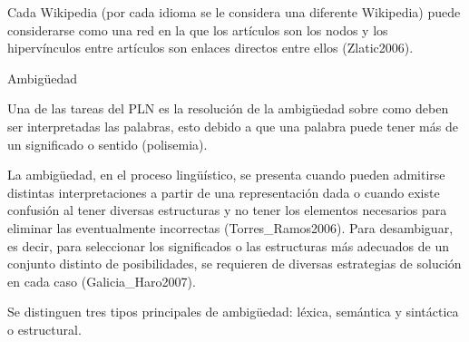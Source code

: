 \documentclass[letterpaper]{article}
\newcommand\textstylebibuscitbase[1]{#1}
\begin{document}
\bigskip

{\sffamily
\textstylebibuscitbase{Cada Wikipedia (por cada idioma se le considera
una diferente Wikipedia) puede considerarse como una red en la que los
art\'iculos son los nodos y los hiperv\'inculos entre
art\'icu}\textstylebibuscitbase{los son enlaces directos entre ellos
}\textstylebibuscitbase{(Zlatic2006)}\textstylebibuscitbase{.}}


\bigskip


\bigskip


\bigskip

{\sffamily
Ambig\"uedad}


\bigskip

{\sffamily
Una de las tareas del PLN es la resoluci\'on de la ambig\"uedad sobre
como deben ser interpretadas las palabras, esto debido a que una
palabra puede tener m\'as de un significado o sentido (polisemia). }


\bigskip

{\sffamily
La ambig\"uedad, en el proceso ling\"u\'istico, se presenta cuando
pueden admitirse distintas interpretaciones a partir de una
representaci\'on dada o cuando existe confusi\'on al tener diversas
estructuras y no tener los elementos necesarios para eliminar las
eventualmente incorrectas \textstylebibuscitbase{(Torres\_Ramos2006)}.
\foreignlanguage{spanish}{Para desambiguar, es decir, para seleccionar
los significados o
}\textstylebibuscitbase{\foreignlanguage{spanish}{las estructuras m\'as
adecuados de un conjunto distinto de posibilidades, se requieren de
diversas estrategias de soluci\'on en cada caso
}}\textstylebibuscitbase{\foreignlanguage{spanish}{(Galicia\_Haro2007)}}\textstylebibuscitbase{\foreignlanguage{spanish}{.}}}


\bigskip

{\sffamily
\textstylebibuscitbase{\foreignlanguage{spanish}{Se distinguen tres
tipos principales de ambig\"uedad: l\'exica, sem\'antica y sint\'actica
o estructural. }}}


\bigskip
\end{document}
